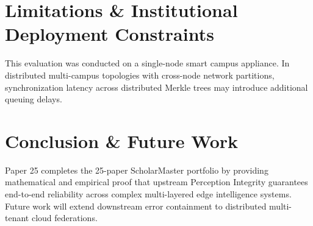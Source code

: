 \documentclass[conference]{IEEEtran}
\begin{document}
\section{Limitations & Institutional Deployment Constraints}
This evaluation was conducted on a single-node smart campus appliance. In distributed multi-campus topologies with cross-node network partitions, synchronization latency across distributed Merkle trees may introduce additional queuing delays.

\section{Conclusion & Future Work}
Paper 25 completes the 25-paper ScholarMaster portfolio by providing mathematical and empirical proof that upstream Perception Integrity guarantees end-to-end reliability across complex multi-layered edge intelligence systems. Future work will extend downstream error containment to distributed multi-tenant cloud federations.
\end{document}
